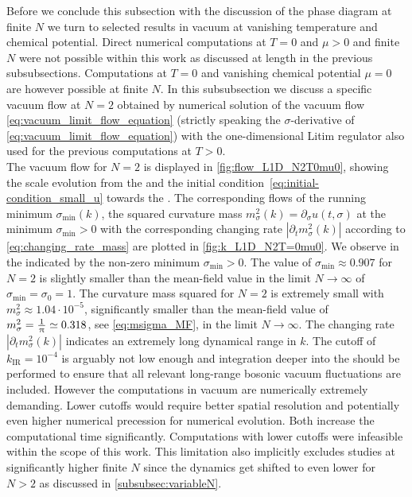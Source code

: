 	Before we conclude this subsection with the discussion of the phase diagram at finite $N$ we turn to selected results in vacuum at vanishing temperature and chemical potential. Direct numerical computations at $T=0$ and $\mu>0$ and finite $N$ were not possible within this work as discussed at length in the previous subsubsections. Computations at $T=0$ and vanishing chemical potential $\mu=0$ are however possible at finite $N$. In this subsubsection we discuss a specific vacuum flow at $N=2$ obtained by numerical solution of the vacuum flow \cref{eq:vacuum_limit_flow_equation} (strictly speaking the $\sigma$-derivative of \cref{eq:vacuum_limit_flow_equation}) with the one-dimensional Litim regulator also used for the previous computations at $T>0$.\\

	The vacuum \frg{} flow for $N=2$ is displayed in \cref{fig:flow_L1D_N2T0mu0}, showing the scale evolution from the \uv{} and the initial condition~\eqref{eq:initial-condition_small_u} towards the \ir{}. The corresponding flows of the running minimum $\sigma_{\mathrm{min}} ( k )$, the squared curvature mass $m_\sigma^2 ( k ) = \partial_\sigma u ( t, \sigma )$ at the \ir{} minimum $\sigma_\mathrm{min}>0$ with the corresponding changing rate  $| \partial_t m_\sigma^2 ( k ) |$ according to \cref{eq:changing_rate_mass} are plotted in \cref{fig:k_L1D_N2T=0mu0}. We observe \ssb{} in the \ir{} indicated by the non-zero minimum $\sigma_\mathrm{min} > 0$. The value of $\sigma_\mathrm{min}\approx 0.907$ for $N = 2$ is slightly smaller than the mean-field value in the limit $N \rightarrow \infty$ of $\sigma_\mathrm{min} = \sigma_0 = 1$. The curvature mass squared for $N = 2$ is extremely small with {$m_\sigma^2 \approx 1.04 \cdot 10^{-5}$,} significantly smaller than the mean-field value of $m_\sigma^2 =\tfrac{1}{\mkern1.0mu\uppi\mkern1.0mu}\simeq 0.318$, see \cref{eq:msigma_MF}, in the limit $N \rightarrow \infty$. The changing rate  $| \partial_t m_\sigma^2 ( k ) |$ indicates an extremely long dynamical range in \rgscale{} $k$. The \ir{} cutoff of $k_\mathrm{IR}=10^{-4}$ is arguably not low enough and integration deeper into the \ir{} should be performed to ensure that all relevant long-range bosonic vacuum fluctuations are included. However the computations in vacuum are numerically extremely demanding. Lower \ir{} cutoffs would require better spatial resolution and potentially even higher numerical precession for numerical \rgtime{} evolution. Both increase the computational time significantly. Computations with lower \ir{} cutoffs were infeasible within the scope of this work. This limitation also implicitly excludes studies at significantly higher finite $N$ since the dynamics get shifted to even lower \rgscales{} for $N>2$ as discussed in \cref{subsubsec:variableN}.

